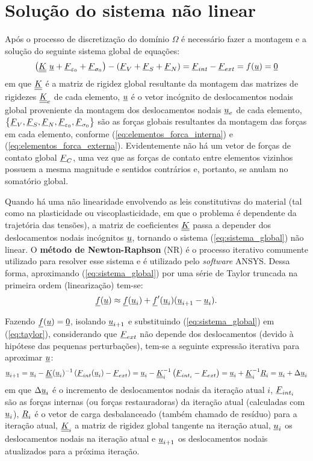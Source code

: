 \section{Solução do sistema não linear}
\label{cap: solução do sistema}

Após o processo de discretização do domínio $\Omega$ é necessário fazer a montagem e a solução do seguinte sistema global de equações:
\begin{equation}
	\label{eq:sistema_global}
	\left(\underline{\underline K}~\underline u + \underline{F}_{\varepsilon_{0}} + \underline{F}_{\sigma_{0}}\right) - \left(\underline{F}_V+\underline{F}_S+\underline{F}_N \right) = \underline{F}_{int} - \underline{F}_{ext} = f(\underline u) = \underline{0}  
\end{equation}
em que $\underline{\underline K}$ é a matriz de rigidez global resultante da montagem das matrizes de rigidezes $\underline{\underline K}_e$ de cada elemento, $\underline u$ é o vetor incógnito de deslocamentos nodais global proveniente da montagem dos deslocamentos nodais $\underline u_e$ de cada elemento, $\left\{\underline{F}_V,\underline{F}_S,\underline{F}_N,\underline{F}_{\varepsilon_0},\underline{F}_{\sigma_0} \right\}$ são as forças globais resultantes da montagem das forças em cada elemento, conforme (\ref{eq:elementos_forca_interna}) e (\ref{eq:elementos_forca_externa}). Evidentemente não há um vetor de forças de contato global $\underline{F}_C$, uma vez que as forças de contato entre elementos vizinhos possuem a mesma magnitude e sentidos contrários e, portanto, se anulam no somatório global.

Quando há uma não linearidade envolvendo as leis constitutivas do material (tal como na plasticidade ou viscoplasticidade, em que o problema é dependente da trajetória das tensões), a matriz de coeficientes $\underline{\underline K}$ passa a depender dos deslocamentos nodais incógnitos  $\underline u$, tornando o sistema (\ref{eq:sistema_global}) não linear. O \textbf{método de Newton-Raphson} (NR) é o processo iterativo comumente utilizado para resolver esse sistema e é utilizado pelo \textit{software} ANSYS. Dessa forma, aproximando (\ref{eq:sistema_global}) por uma série de Taylor truncada na primeira ordem (linearização) tem-se:
\begin{equation}
	\label{eq:taylor}
	\underline f(\underline u) \approx \underline f(\underline u_i) + \underline f'(\underline u_i)(\underline u_{i+1}-\underline u_i).
\end{equation}

Fazendo $\underline f(\underline u) = \underline{0}$, isolando $\underline u_{i+1}$ e substituindo (\ref{eq:sistema_global}) em (\ref{eq:taylor}), considerando que $\underline{F}_{ext}$ não depende dos deslocamentos (devido à hipótese das pequenas perturbações), tem-se a seguinte expressão iterativa para aproximar $\underline u$:
\begin{equation}
	\label{eq:NR}
	\underline u_{i+1} = \underline u_i - \underline{\underline K}(\underline u_i)^{-1}\left(\underline{F}_{int}(\underline u_i)-\underline{F}_{ext} \right) = \underline u_i - \underline{\underline K}_i^{-1} \left(\underline{F}_{int_i} - \underline{F}_{ext} \right) = \underline u_i + \underline{\underline K}_i^{-1}\underline{R}_i = \underline u_i + \Delta \underline u_i
\end{equation}
em que $\Delta \underline u_i$ é o incremento de deslocamentos nodais da iteração atual $i$, $\underline{F}_{int_i}$ são as forças internas (ou forças restauradoras) da iteração atual (calculadas com $\underline u_i$), $\underline{R}_i$ é o vetor de carga desbalanceado (também chamado de resíduo) para a iteração atual, $\underline{\underline K}_i$ a matriz de rigidez global tangente na iteração atual, $\underline u_i$ os deslocamentos nodais na iteração atual e $\underline u_{i+1}$ os deslocamentos nodais atualizados para a próxima iteração.

